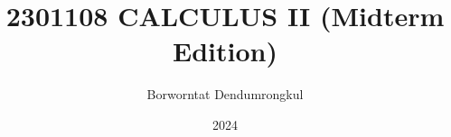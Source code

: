 \documentclass[11pt,titlepage=false]{scrreprt}
\begin{document}
\setlength{\textheight}{8.5in}
\setlength{\parskip}{2ex plus 0.5ex minus 0.2ex}
\setlength{\parindent}{0pt}


\title{2301108 CALCULUS II (Midterm Edition)}
\author{Borworntat Dendumrongkul}
\date{2024}
\maketitle

\tableofcontents

\setcounter{secnumdepth}{1}






% 
% 
\end{document}
